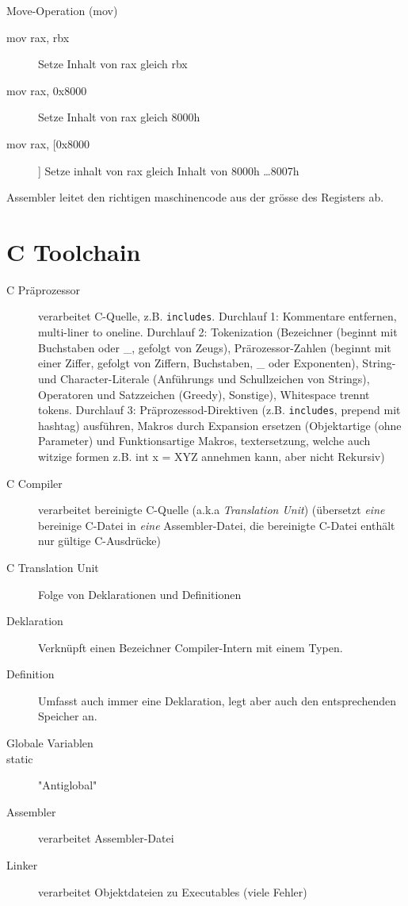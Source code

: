 \begin{multicols*}{4}
    Move-Operation (mov)
    \begin{description}
        \item[mov rax, rbx] Setze Inhalt von rax gleich rbx
        \item[mov rax, 0x8000] Setze Inhalt von rax gleich 8000h
        \item[mov rax, [0x8000]] Setze inhalt von rax gleich Inhalt von 8000h \dots 8007h
    \end{description}

    Assembler leitet den richtigen maschinencode aus der grösse des Registers ab.

    \section{C Toolchain}
    \begin{description}
        \item[C Präprozessor] verarbeitet C-Quelle, z.B. \texttt{includes}. Durchlauf 1: Kommentare entfernen, multi-liner to oneline. Durchlauf 2: Tokenization (Bezeichner (beginnt mit Buchstaben oder \_, gefolgt von Zeugs), Prärozessor-Zahlen (beginnt mit einer Ziffer, gefolgt von Ziffern, Buchstaben, \_ oder Exponenten), String- und Character-Literale (Anführungs und Schullzeichen von Strings), Operatoren und Satzzeichen (Greedy), Sonstige), Whitespace trennt tokens. Durchlauf 3: Präprozessod-Direktiven (z.B. \texttt{includes}, prepend mit hashtag) ausführen, Makros durch Expansion ersetzen (Objektartige (ohne Parameter) und Funktionsartige Makros, textersetzung, welche auch witzige formen z.B. int x = XYZ annehmen kann, aber nicht Rekursiv)
        \item[C Compiler] verarbeitet bereinigte C-Quelle (a.k.a \emph{Translation Unit}) (übersetzt \emph{eine} bereinige C-Datei in \emph{eine} Assembler-Datei, die bereinigte C-Datei enthält nur gültige C-Ausdrücke)
        \item[C Translation Unit] Folge von Deklarationen und Definitionen
        \item[Deklaration] Verknüpft einen Bezeichner Compiler-Intern mit einem Typen.
        \item[Definition] Umfasst auch immer eine Deklaration, legt aber auch den entsprechenden Speicher an.
        \item[Globale Variablen]
        \item[static] "Antiglobal"
        \item[Assembler] verarbeitet Assembler-Datei
        \item[Linker] verarbeitet Objektdateien zu Executables (viele Fehler)
    \end{description}


\end{multicols*}
